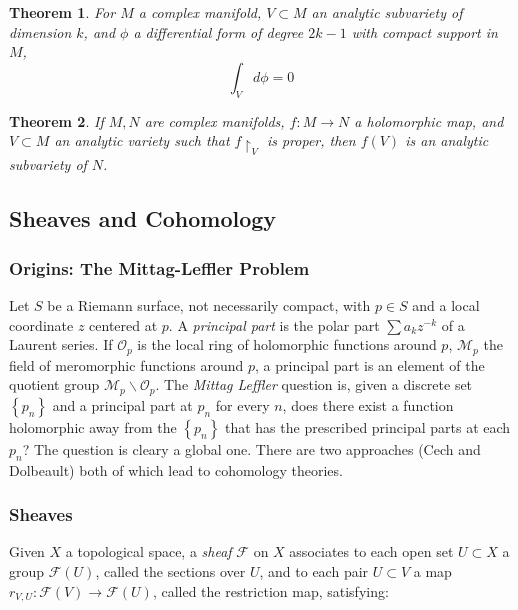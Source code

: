 \documentclass{article}
\newtheorem{thm}{Theorem}
\begin{document}
\begin{thm}

For $M$ a complex manifold, $V \subset M$ an analytic subvariety of dimension $k$, and $\phi$ a differential form of degree $2k-1$ with compact support in $M$,
\[
\int_V d \phi = 0
\]


\end{thm}


\begin{thm}

	If $M,N$ are complex manifolds, $f:M \to N$ a holomorphic map, and $V \subset M$ an analytic variety such that $f \restriction_V$ is proper, then $f(V)$ is an analytic subvariety of $N$.

\end{thm}

\subsection{Sheaves and Cohomology}

\subsubsection{Origins: The Mittag-Leffler Problem}
Let $S$ be a Riemann surface, not necessarily compact, with $p \in S$ and a local coordinate $z$ centered at $p$. A \textit{principal part} is the polar part $ \sum a_k z^{-k}$ of a Laurent series. If $ \mathcal{O}_p$ is the local ring of holomorphic functions around $p$, $ \mathcal{M}_p$ the field of meromorphic functions around $p$, a principal part is an element of the quotient group $ \mathcal{M}_p \backslash \mathcal{O}_p$. The \textit{Mittag Leffler} question is, given a discrete set $ \left\{ p_n \right\} $ and a principal part at $p_n$ for every $n$, does there exist a function holomorphic away from the $ \left\{ p_n \right\} $ that has the prescribed principal parts at each $p_n$? The question is cleary a global one. There are two approaches (Cech and Dolbeault) both of which lead to cohomology theories.

\subsubsection{Sheaves}

\indent Given $X$ a topological space, a \textit{sheaf} $ \mathcal{F}$ on $X$ associates to each open set $U \subset X$ a group $ \mathcal{F}(U)$, called the sections over $U$, and to each pair $U \subset V$  a map $ r_{V,U}: \mathcal{F}(V) \to \mathcal{F}(U)$, called the restriction map, satisfying:
\end{document}
